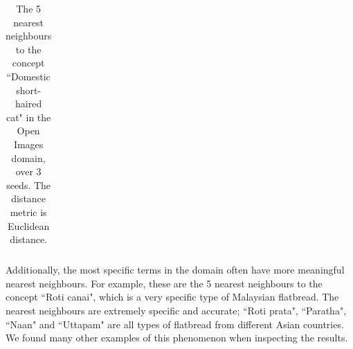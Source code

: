 \begin{table}[H]
\begin{tabular}{@{}llll@{}}
\end{tabular}
\centering
\caption{\label{table:subclasscat}The 5 nearest neighbours to the concept ``Domestic short-haired cat" in the Open Images domain, over 3 seeds. The distance metric is Euclidean distance.}
\end{table}

Additionally, the most specific terms in the domain often have more meaningful nearest neighbours. For example, these are the 5 nearest neighbours to the concept ``Roti canai", which is a very specific type of Malaysian flatbread. The nearest neighbours are extremely specific and accurate; ``Roti prata", ``Paratha",  ``Naan" and ``Uttapam" are all types of flatbread from different Asian countries. We found many other examples of this phenomenon when inspecting the results. 

